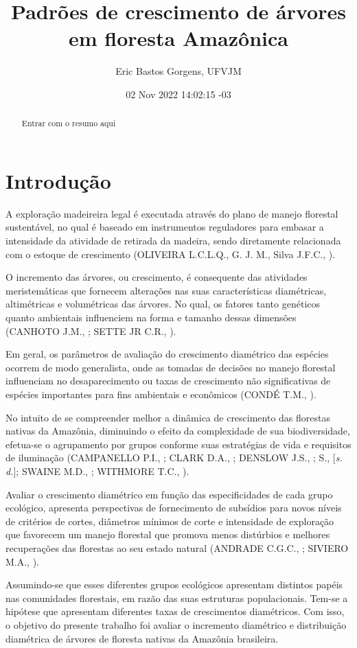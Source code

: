 \documentclass[
]{article}
\title{Padrões de crescimento de árvores em floresta Amazônica}
\author{Eric Bastos Gorgens, UFVJM}
\date{02 Nov 2022 14:02:15 -03}
\begin{document}
\maketitle
\begin{abstract}
Entrar com o resumo aqui
\end{abstract}

\hypertarget{introduuxe7uxe3o}{%
\section{Introdução}\label{introduuxe7uxe3o}}

A exploração madeireira legal é executada através do plano de manejo
florestal sustentável, no qual é baseado em instrumentos reguladores
para embasar a intensidade da atividade de retirada da madeira, sendo
diretamente relacionada com o estoque de crescimento (OLIVEIRA L.C.L.Q.,
G. J. M., Silva J.F.C., ).

O incremento das árvores, ou crescimento, é consequente das atividades
meristemáticas que fornecem alterações nas suas características
diamétricas, altimétricas e volumétricas das árvores. No qual, os
fatores tanto genéticos quanto ambientais influenciem na forma e tamanho
dessas dimensões (CANHOTO J.M., ; SETTE JR C.R., ).

Em geral, os parâmetros de avaliação do crescimento diamétrico das
espécies ocorrem de modo generalista, onde as tomadas de decisões no
manejo florestal influenciam no desaparecimento ou taxas de crescimento
não significativas de espécies importantes para fins ambientais e
econômicos (CONDÉ T.M., ).

No intuito de se compreender melhor a dinâmica de crescimento das
florestas nativas da Amazônia, diminuindo o efeito da complexidade de
sua biodiversidade, efetua-se o agrupamento por grupos conforme suas
estratégias de vida e requisitos de iluminação (CAMPANELLO P.I., ; CLARK
D.A., ; DENSLOW J.S., ; S., {[}\emph{s. d.}{]}; SWAINE M.D., ; WITHMORE
T.C., ).

Avaliar o crescimento diamétrico em função das especificidades de cada
grupo ecológico, apresenta perspectivas de fornecimento de subsídios
para novos níveis de critérios de cortes, diâmetros mínimos de corte e
intensidade de exploração que favorecem um manejo florestal que promova
menos distúrbios e melhores recuperações das florestas ao seu estado
natural (ANDRADE C.G.C., ; SIVIERO M.A., ).

Assumindo-se que esses diferentes grupos ecológicos apresentam distintos
papéis nas comunidades florestais, em razão das suas estruturas
populacionais. Tem-se a hipótese que apresentam diferentes taxas de
crescimentos diamétricos. Com isso, o objetivo do presente trabalho foi
avaliar o incremento diamétrico e distribuição diamétrica de árvores de
floresta nativas da Amazônia brasileira.
\end{document}
